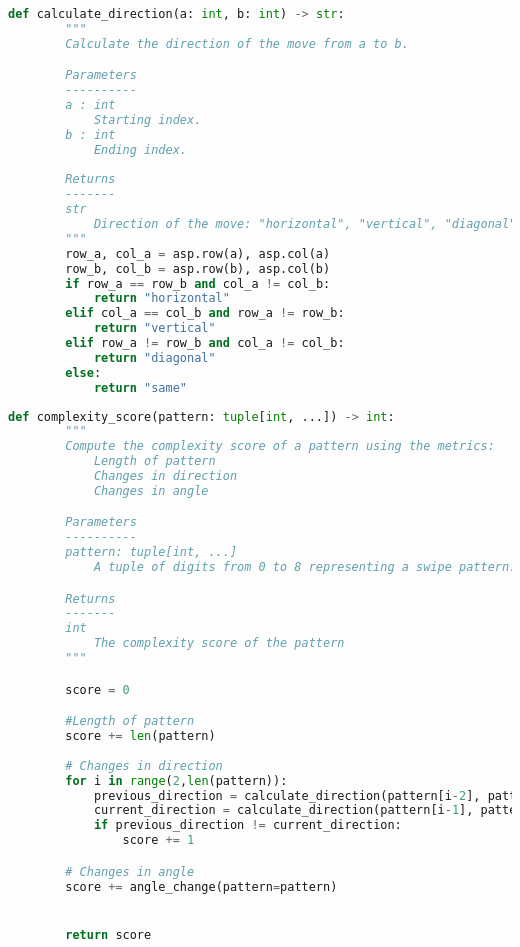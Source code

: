 \documentclass[12pt]{article}
\theoremstyle{definition}
\begin{document}
\begin{lstlisting}[language=Python, caption=Code Snippet for the metric change in direction]
    def calculate_direction(a: int, b: int) -> str: 
        """ 
        Calculate the direction of the move from a to b. 

        Parameters 
        ---------- 
        a : int 
            Starting index. 
        b : int 
            Ending index. 
            
        Returns 
        ------- 
        str 
            Direction of the move: "horizontal", "vertical", "diagonal", or "same". 
        """ 
        row_a, col_a = asp.row(a), asp.col(a) 
        row_b, col_b = asp.row(b), asp.col(b) 
        if row_a == row_b and col_a != col_b: 
            return "horizontal" 
        elif col_a == col_b and row_a != row_b: 
            return "vertical" 
        elif row_a != row_b and col_a != col_b: 
            return "diagonal" 
        else: 
            return "same"
\end{lstlisting}

\begin{lstlisting}[language=Python, caption=Code snippet to compute pattern complexity score.]
    def complexity_score(pattern: tuple[int, ...]) -> int:
        """
        Compute the complexity score of a pattern using the metrics:
            Length of pattern
            Changes in direction
            Changes in angle

        Parameters
        ----------
        pattern: tuple[int, ...]
            A tuple of digits from 0 to 8 representing a swipe pattern.

        Returns
        -------
        int 
            The complexity score of the pattern
        """

        score = 0

        #Length of pattern
        score += len(pattern)
        
        # Changes in direction
        for i in range(2,len(pattern)):
            previous_direction = calculate_direction(pattern[i-2], pattern[i-1])
            current_direction = calculate_direction(pattern[i-1], pattern[i])
            if previous_direction != current_direction:
                score += 1

        # Changes in angle 
        score += angle_change(pattern=pattern)


        return score
\end{lstlisting}
\end{document}

